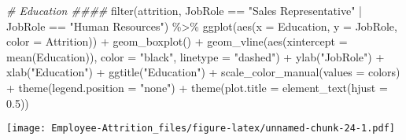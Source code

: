 \documentclass[
]{article}
\newenvironment{Shaded}{\begin{snugshade}}{\end{snugshade}}
\newcommand{\AttributeTok}[1]{\textcolor[rgb]{0.77,0.63,0.00}{#1}}
\newcommand{\CommentTok}[1]{\textcolor[rgb]{0.56,0.35,0.01}{\textit{#1}}}
\newcommand{\FloatTok}[1]{\textcolor[rgb]{0.00,0.00,0.81}{#1}}
\newcommand{\FunctionTok}[1]{\textcolor[rgb]{0.00,0.00,0.00}{#1}}
\newcommand{\NormalTok}[1]{#1}
\newcommand{\SpecialCharTok}[1]{\textcolor[rgb]{0.00,0.00,0.00}{#1}}
\newcommand{\StringTok}[1]{\textcolor[rgb]{0.31,0.60,0.02}{#1}}
\begin{document}
\begin{Shaded}
\begin{Highlighting}[]
\CommentTok{\# Education \#\#\#\#}
\FunctionTok{filter}\NormalTok{(attrition, JobRole }\SpecialCharTok{==} \StringTok{"Sales Representative"} \SpecialCharTok{|}\NormalTok{ JobRole }\SpecialCharTok{==} \StringTok{"Human Resources"}\NormalTok{) }\SpecialCharTok{\%\textgreater{}\%}
  \FunctionTok{ggplot}\NormalTok{(}\FunctionTok{aes}\NormalTok{(}\AttributeTok{x =}\NormalTok{ Education, }\AttributeTok{y =}\NormalTok{ JobRole, }\AttributeTok{color =}\NormalTok{ Attrition)) }\SpecialCharTok{+}
  \FunctionTok{geom\_boxplot}\NormalTok{() }\SpecialCharTok{+}
  \FunctionTok{geom\_vline}\NormalTok{(}\FunctionTok{aes}\NormalTok{(}\AttributeTok{xintercept =} \FunctionTok{mean}\NormalTok{(Education)), }\AttributeTok{color =} \StringTok{"black"}\NormalTok{, }\AttributeTok{linetype =} \StringTok{"dashed"}\NormalTok{) }\SpecialCharTok{+}
  \FunctionTok{ylab}\NormalTok{(}\StringTok{"JobRole"}\NormalTok{) }\SpecialCharTok{+}
  \FunctionTok{xlab}\NormalTok{(}\StringTok{"Education"}\NormalTok{) }\SpecialCharTok{+}
  \FunctionTok{ggtitle}\NormalTok{(}\StringTok{"Education"}\NormalTok{) }\SpecialCharTok{+}
  \FunctionTok{scale\_color\_manual}\NormalTok{(}\AttributeTok{values =}\NormalTok{ colors) }\SpecialCharTok{+}
  \FunctionTok{theme}\NormalTok{(}\AttributeTok{legend.position =} \StringTok{"none"}\NormalTok{) }\SpecialCharTok{+}
  \FunctionTok{theme}\NormalTok{(}\AttributeTok{plot.title =} \FunctionTok{element\_text}\NormalTok{(}\AttributeTok{hjust =} \FloatTok{0.5}\NormalTok{)) }
\end{Highlighting}
\end{Shaded}

\texttt{[image: Employee-Attrition\_files/figure-latex/unnamed-chunk-24-1.pdf]}
\end{document}
